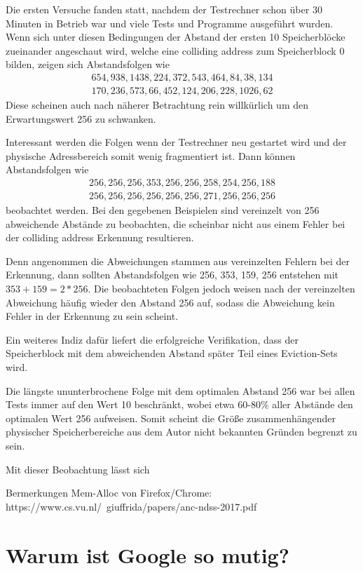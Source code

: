 Die ersten Versuche fanden statt, nachdem der Testrechner schon über 30 Minuten in Betrieb war und viele Tests und Programme ausgeführt wurden.
Wenn sich unter diesen Bedingungen der Abstand der ersten 10 Speicherblöcke zueinander angeschaut wird, welche eine colliding address zum Speicherblock 0 bilden, zeigen sich Abstandsfolgen wie 
\begin{align*} 
654, 938, 1438, 224, 372, 543, 464, 84, 38, 134\\
170, 236, 573, 66, 452, 124, 206, 228, 1026, 62
\end{align*}
Diese scheinen auch nach näherer Betrachtung rein willkürlich um den Erwartungswert 256 zu schwanken.

Interessant werden die Folgen wenn der Testrechner neu gestartet wird und der physische Adressbereich somit wenig fragmentiert ist.
Dann können Abstandsfolgen wie 
\begin{align*} 
256, 256, 256, 353, 256, 256, 258, 254, 256, 188\\
256, 256, 256, 256, 256, 256, 271, 256, 256, 256
\end{align*}
beobachtet werden.
Bei den gegebenen Beispielen sind vereinzelt von 256 abweichende Abstände zu beobachten, die scheinbar nicht aus einem Fehler bei der colliding address Erkennung resultieren.

Denn angenommen die Abweichungen stammen aus vereinzelten Fehlern bei der Erkennung, dann sollten Abstandsfolgen wie 256, 353, 159, 256 entstehen mit $353+159=2*256$.
Die beobachteten Folgen jedoch weisen nach der vereinzelten Abweichung häufig wieder den Abstand 256 auf, sodass die Abweichung kein Fehler in der Erkennung zu sein scheint.

Ein weiteres Indiz dafür liefert die erfolgreiche Verifikation, dass der Speicherblock mit dem abweichenden Abstand später Teil eines Eviction-Sets wird.

Die längste ununterbrochene Folge mit dem optimalen Abstand 256 war bei allen Tests immer auf den Wert 10 beschränkt, wobei etwa 60-80\% aller Abstände den optimalen Wert 256 aufweisen.
Somit scheint die Größe zusammenhängender physischer Speicherbereiche aus dem Autor nicht bekannten Gründen begrenzt zu sein.

Mit dieser Beobachtung lässt sich 

Bermerkungen Mem-Alloc von Firefox/Chrome: https://www.cs.vu.nl/~giuffrida/papers/anc-ndss-2017.pdf
\cite{ASLROnTheLine}

\section{Warum ist Google so mutig?}
\label{GooglePageIsolation}

